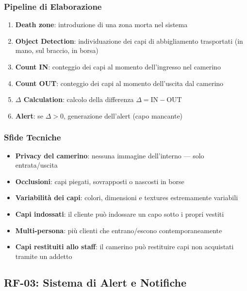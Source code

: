 \documentclass[a4paper, 12pt]{article}
\begin{document}
\subsubsection{Pipeline di Elaborazione}

\begin{enumerate}
    \item \textbf{Death zone}: introduzione di una zona morta nel sistema 
    \item \textbf{Object Detection}: individuazione dei capi di abbigliamento trasportati (in mano, sul braccio, in borsa)
    \item \textbf{Count IN}: conteggio dei capi al momento dell'ingresso nel camerino
    \item \textbf{Count OUT}: conteggio dei capi al momento dell'uscita dal camerino
    \item \textbf{$\Delta$ Calculation}: calcolo della differenza $\Delta = \text{IN} - \text{OUT}$
    \item \textbf{Alert}: se $\Delta > 0$, generazione dell'alert (capo mancante)
\end{enumerate}

\subsubsection{Sfide Tecniche}

\begin{itemize}
    \item \textbf{Privacy del camerino}: nessuna immagine dell'interno — solo entrata/uscita
    \item \textbf{Occlusioni}: capi piegati, sovrapposti o nascosti in borse
    \item \textbf{Variabilità dei capi}: colori, dimensioni e textures estremamente variabili
    \item \textbf{Capi indossati}: il cliente può indossare un capo sotto i propri vestiti
    \item \textbf{Multi-persona}: più clienti che entrano/escono contemporaneamente
    \item \textbf{Capi restituiti allo staff}: il camerino può restituire capi non acquistati tramite un addetto
\end{itemize}


\subsection{RF-03: Sistema di Alert e Notifiche}
\end{document}
